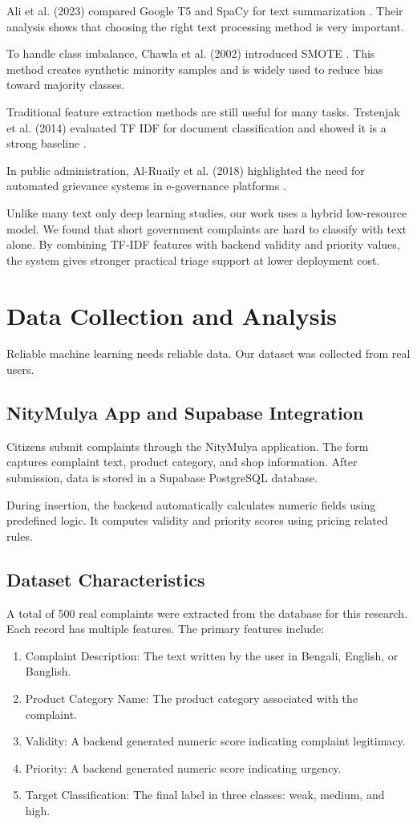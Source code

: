 \documentclass[a4paper,fleqn]{cas-dc}
\begin{document}
Ali et al. (2023) compared Google T5 and SpaCy for text summarization \cite{ali2023}. Their analysis shows that choosing the right text processing method is very important.

To handle class imbalance, Chawla et al. (2002) introduced SMOTE \cite{chawla2002}. This method creates synthetic minority samples and is widely used to reduce bias toward majority classes.

Traditional feature extraction methods are still useful for many tasks. Trstenjak et al. (2014) evaluated TF IDF for document classification and showed it is a strong baseline \cite{trstenjak2014}.

In public administration, Al-Ruaily et al. (2018) highlighted the need for automated grievance systems in e-governance platforms \cite{alruaily2018}.

Unlike many text only deep learning studies, our work uses a hybrid low-resource model. We found that short government complaints are hard to classify with text alone. By combining TF-IDF features with backend validity and priority values, the system gives stronger practical triage support at lower deployment cost.

\section{Data Collection and Analysis}

Reliable machine learning needs reliable data. Our dataset was collected from real users.

\subsection{NityMulya App and Supabase Integration}
Citizens submit complaints through the NityMulya application. The form captures complaint text, product category, and shop information. After submission, data is stored in a Supabase PostgreSQL database.

During insertion, the backend automatically calculates numeric fields using predefined logic. It computes validity and priority scores using pricing related rules.

\subsection{Dataset Characteristics}
A total of 500 real complaints were extracted from the database for this research. Each record has multiple features.
The primary features include:
\begin{enumerate}
	\item Complaint Description: The text written by the user in Bengali, English, or Banglish.
	\item Product Category Name: The product category associated with the complaint.
	\item Validity: A backend generated numeric score indicating complaint legitimacy.
	\item Priority: A backend generated numeric score indicating urgency.
	\item Target Classification: The final label in three classes: weak, medium, and high.
\end{enumerate}
\end{document}
